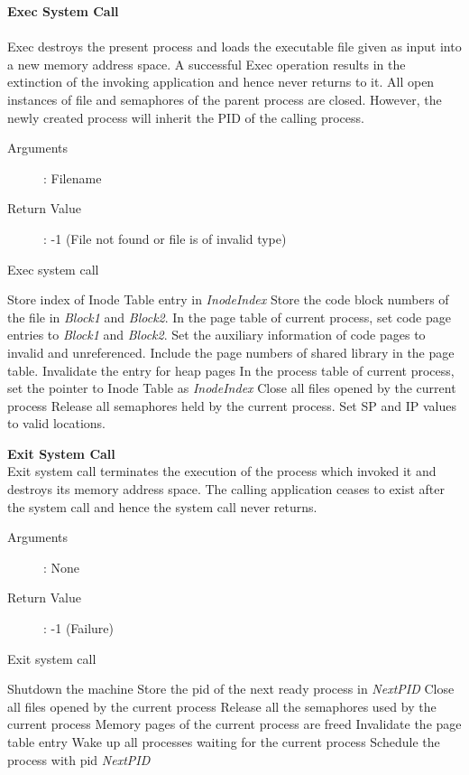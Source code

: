 \documentclass[10pt]{article}
\begin{document}
\textbf{Exec System Call}
\\ \\
Exec destroys the present process and loads the executable file given as input into a new memory address space. A successful Exec operation results in the extinction of the invoking application and hence never returns to it. All open instances of file and semaphores of the parent process are closed. However, the newly created process will inherit the PID of the calling process.
\begin{description}
\item[Arguments]: Filename
\item[Return Value]: -1 (File not found or file is of invalid type)
\end{description} 
\begin{algorithm}
\caption{Exec system call}
\begin{algorithmic}
\ELSE
    \ELSE
        \STATE Store index of Inode Table entry in \textit{InodeIndex}
        \STATE Store the code block numbers of the file in \textit{Block1} and \textit{Block2}.
    \ENDIF
\ENDIF
\STATE In the page table of current process, set code page entries to \textit{Block1} and \textit{Block2}.
\STATE Set the auxiliary information of code pages to invalid and unreferenced.
\STATE Include the page numbers of shared library in the page table.
\STATE Invalidate the entry for heap pages
\STATE In the process table of current process, set the pointer to Inode Table as \textit{InodeIndex}
\STATE Close all files opened by the current process
\STATE Release all semaphores held by the current process.
\STATE Set SP and IP values to valid locations.
\end{algorithmic}
\end{algorithm}
\textbf{Exit System Call}
\vspace{2mm}\\
 Exit system call terminates the execution of the process which invoked it and destroys its memory address space. The calling application ceases to exist after the system call and hence the system call never returns.
\begin{description}
\item[Arguments]: None
\item[Return Value]: -1 (Failure)
\end{description} 
\begin{algorithm}
\caption{Exit system call}
\begin{algorithmic}
    \STATE Shutdown the machine
\ELSE 
    \STATE Store the pid of the next ready process in \textit{NextPID}
\ENDIF
\STATE Close all files opened by the current process
\STATE Release all the semaphores used by the current process
\STATE Memory pages of the current process are freed
\STATE Invalidate the page table entry
\STATE Wake up all processes waiting for the current process
\STATE Schedule the process with pid \textit{NextPID}
\RETURN 
\end{algorithmic}
\end{algorithm}
\end{document}
